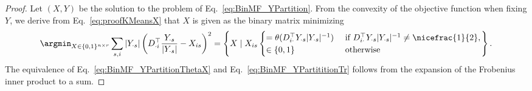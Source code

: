 \BMFpartition*
\begin{proof}
Let $(X,Y)$ be the solution to the problem of Eq.~\eqref{eq:BinMF_YPartition}. From the convexity of the objective function when fixing $Y$, we derive from Eq.~\eqref{eq:proofKMeansX} that $X$ is given as the binary matrix minimizing
\[\argmin_{X\in \{0,1\}^{n\times r}}\sum_{s,i}|Y_{\cdot s}|\left(D_{\cdot i}^\top \frac{Y_{\cdot s}}{|Y_{\cdot s}|}-X_{is}\right)^2 = \left\{X\mid X_{is} 
\begin{cases}
= \theta(D_{i\cdot}^\top Y_{\cdot s}|Y_{\cdot s}|^{-1}) &\text{ if } D_{i\cdot}^\top Y_{\cdot s}|Y_{\cdot s}|^{-1}\neq \nicefrac{1}{2},\\ 
\in\{0,1\} &\text{ otherwise} 
\end{cases}\right\}.\]
The equivalence of Eq.~\eqref{eq:BinMF_YPartitionThetaX} and Eq.~\eqref{eq:BinMF_YPartititionTr} follows from the expansion of the Frobenius inner product to a sum.
\end{proof}
